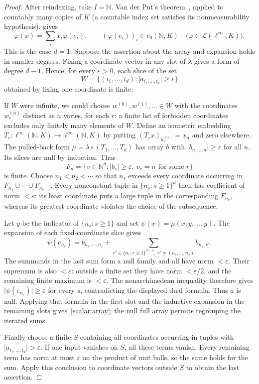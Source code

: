 \documentclass[11pt]{amsart}
\theoremstyle{definition}
\theoremstyle{remark}
\numberwithin{equation}{section}
\newcommand{\N}{\mathbb N}
\newcommand{\cL}{\mathcal L}
\newcommand{\linf}{\ell^\infty}
\newcommand{\abs}[1]{\lvert #1\rvert}
\begin{document}
\begin{proof}
After reindexing, take $I=\N$. Van der Put's theorem~\cite[Th\'eor\`eme~4.1]{VdP}, applied to countably
many copies of $K$ (a countable index set satisfies its nonmeasurability hypothesis), gives
\[
 \varphi(x)=\sum_i x_i\varphi(e_i),\qquad (\varphi(e_i))_i\in c_0(\N,K)
 \quad\bigl(\varphi\in\cL(\linf,K)\bigr).
\]
This is the case $d=1$. Suppose the assertion about the array and expansion holds in smaller degrees.
Fixing a coordinate vector in any slot of $\lambda$ gives a form of degree $d-1$. Hence, for every
$\varepsilon>0$, each slice of the set
\[
 W=\{(i_1,\dots,i_d):\abs{a_{i_1,\dots,i_d}}\ge\varepsilon\}
\]
obtained by fixing one coordinate is finite.

If $W$ were infinite, we could choose $w^{(0)},w^{(1)},\ldots\in W$ with the coordinates
$w^{(n)}_r$ distinct as $n$ varies, for each $r$: a finite list of forbidden coordinates excludes only
finitely many elements of $W$. Define an isometric embedding $T_r\colon\linf(\N,K)\to\linf(\N,K)$
by putting $(T_rx)_{w^{(n)}_r}=x_n$ and zero elsewhere. The pulled-back form
$\mu=\lambda\circ(T_1,\dots,T_d)$ has array $b$ with $\abs{b_{n,\dots,n}}\ge\varepsilon$ for all $n$.
Its slices are null by induction. Thus
\[
 F_n=\{v\in\N^d:\abs{b_v}\ge\varepsilon,\ v_r=n\text{ for some }r\}
\]
is finite. Choose $n_1<n_2<\cdots$ so that $n_s$ exceeds every coordinate occurring in
$F_{n_1}\cup\cdots\cup F_{n_{s-1}}$. Every nonconstant tuple in $\{n_s:s\ge1\}^d$ then has coefficient
of norm $<\varepsilon$: its least coordinate puts a large tuple in the corresponding $F_{n_r}$,
whereas its greatest coordinate violates the choice of the subsequence.

Let $y$ be the indicator of $\{n_s:s\ge1\}$ and set $\psi(x)=\mu(x,y,\dots,y)$. The expansion of each
fixed-coordinate slice gives
\[
 \psi(e_{n_s})
 =b_{n_s,\dots,n_s}
   +\sum_{v'\in\{n_r:r\ge1\}^{d-1},\ v'\ne(n_s,\dots,n_s)}b_{n_s,v'}.
\]
The summands in the last sum form a null family and all have norm $<\varepsilon$. Their supremum is
also $<\varepsilon$: outside a finite set they have norm $<\varepsilon/2$, and the remaining finite
maximum is $<\varepsilon$. The nonarchimedean inequality therefore gives
$\abs{\psi(e_{n_s})}\ge\varepsilon$ for every $s$, contradicting the displayed dual formula.
Thus $a$ is null. Applying that formula in the first slot and the inductive expansion in the remaining
slots gives~\eqref{scalar:array}; the null full array permits regrouping the iterated sums.

Finally choose a finite $S$ containing all coordinates occurring in tuples with $\abs{a_{i_1,\dots,i_d}}
>\varepsilon$. If one input vanishes on $S$, all these terms vanish. Every remaining term has norm at
most $\varepsilon$ on the product of unit balls, so the same holds for the sum. Apply this conclusion to
coordinate vectors outside $S$ to obtain the last assertion.
\end{proof}
\end{document}
